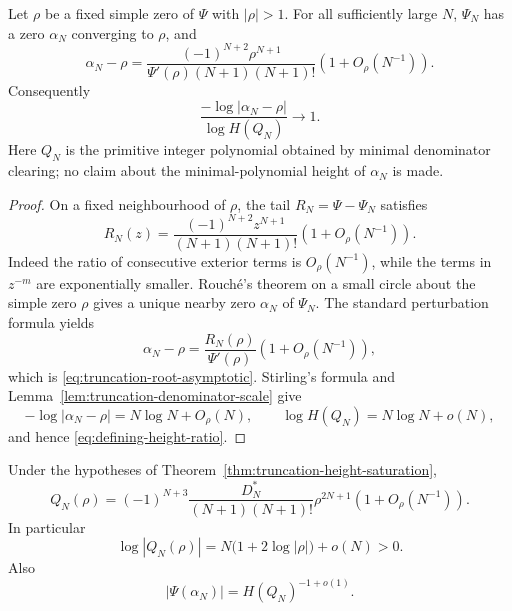 \begin{theorem}
\label{thm:truncation-height-saturation}
Let $\rho$ be a fixed simple zero of $\Psi$ with $|\rho|>1$.  For all
sufficiently large $N$, $\Psi_N$ has a zero $\alpha_N$ converging to
$\rho$, and
\begin{equation}\label{eq:truncation-root-asymptotic}
 \boxed{
 \alpha_N-\rho=
 \frac{(-1)^{N+2}\rho^{N+1}}
 {\Psi'(\rho)(N+1)(N+1)!}
 \left(1+O_\rho(N^{-1})\right).}
\end{equation}
Consequently
\begin{equation}\label{eq:defining-height-ratio}
 \frac{-\log|\alpha_N-\rho|}{\log H(Q_N)}\longrightarrow1.
\end{equation}
Here $Q_N$ is the primitive integer polynomial obtained by minimal
denominator clearing; no claim about the minimal-polynomial height of
$\alpha_N$ is made.
\end{theorem}

\begin{proof}
On a fixed neighbourhood of $\rho$, the tail
$R_N=\Psi-\Psi_N$ satisfies
\begin{equation}\label{eq:Psi-tail-leading}
 R_N(z)=
 \frac{(-1)^{N+2}z^{N+1}}{(N+1)(N+1)!}
 \left(1+O_\rho(N^{-1})\right).
\end{equation}
Indeed the ratio of consecutive exterior terms is $O_\rho(N^{-1})$, while
the terms in $z^{-m}$ are exponentially smaller.  Rouch\'e's theorem on a
small circle about the simple zero $\rho$ gives a unique nearby zero
$\alpha_N$ of $\Psi_N$.  The standard perturbation formula yields
\[
 \alpha_N-\rho
 =\frac{R_N(\rho)}{\Psi'(\rho)}
  \left(1+O_\rho(N^{-1})\right),
\]
which is \eqref{eq:truncation-root-asymptotic}.  Stirling's formula and
Lemma~\ref{lem:truncation-denominator-scale} give
\[
 -\log|\alpha_N-\rho|=N\log N+O_\rho(N),
 \qquad
 \log H(Q_N)=N\log N+o(N),
\]
and hence \eqref{eq:defining-height-ratio}.
\end{proof}

\begin{corollary}
\label{cor:integerized-truncation-growth}
Under the hypotheses of
Theorem~\ref{thm:truncation-height-saturation},
\begin{equation}\label{eq:cleared-value-asymptotic}
 \boxed{
 Q_N(\rho)=
 (-1)^{N+3}\frac{D_N^*}{(N+1)(N+1)!}\rho^{2N+1}
 \left(1+O_\rho(N^{-1})\right).}
\end{equation}
In particular
\begin{equation}\label{eq:cleared-value-growth}
 \log|Q_N(\rho)|
 =N\bigl(1+2\log|\rho|\bigr)+o(N)>0.
\end{equation}
Also
\begin{equation}\label{eq:moving-point-value-scale}
 |\Psi(\alpha_N)|=H(Q_N)^{-1+o(1)}.
\end{equation}
\end{corollary}


